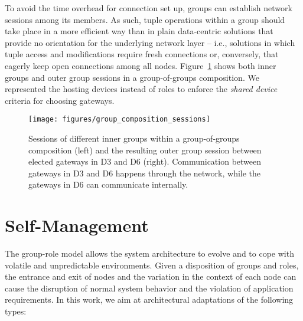 To avoid the time overhead for connection set up, groups can establish network sessions among its members. As such, tuple operations within a group should take place in a more efficient way than in plain data-centric solutions that provide no orientation for the underlying network layer -- i.e., solutions in which tuple access and modifications require fresh connections or, conversely, that eagerly keep open connections among all nodes. Figure~\ref{fig:group_composition_sessions} shows both inner groups and outer group sessions in a group-of-groups composition. We represented the hosting devices instead of roles to enforce the \textit{shared device} criteria for choosing gateways.

\begin{figure}[t!]
	\centering
	\texttt{[image: figures/group\_composition\_sessions]}
	\caption{Sessions of different inner groups within a group-of-groups composition (left) and the resulting outer group session between elected gateways in D3 and D6 (right). Communication between gateways in D3 and D6 happens through the network, while the gateways in D6 can communicate internally.}
	\label{fig:group_composition_sessions}
\end{figure}


\section{Self-Management}\label{sec:group_mangement}



The group-role model allows the system architecture to evolve and to cope with volatile and unpredictable environments. Given a disposition of groups and roles, the entrance and exit of nodes and the variation in the context of each node can cause the disruption of normal system behavior and the violation of application requirements. In this work, we aim at architectural adaptations of the following types:

